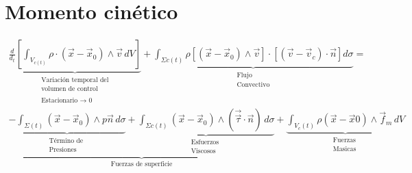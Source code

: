 \documentclass[10pt,a4paper]{article}
\begin{document}
\section{Momento cinético}
\begin{center}
    \begin{tcolorbox}[colback=yellow!40!white, colframe=red!50!black,title=Momento Cinético]
\begin{equation*}
\begin{split}
 \underbrace{\frac{d}{d_{t}}\left[\int_{V_{c(t)}} \rho \cdot\left(\vec{x}-\vec{x}_{0}\right) \wedge \vec{v} \, d V\right]}_{\substack{\text{Variación temporal del} \\ \text{volumen de control} \\ \text{} \\ \text{Estacionario $\xrightarrow{}$ 0}}} + \underbrace{\int_{\Sigma c(t)} \rho\left[\left(\vec{x}-\vec{x}_{0}\right) \wedge \vec{v}\right] \cdot\left[\left(\vec{v}-\vec{v}_{c}\right) \cdot \vec{n}\right] d \sigma}_{\substack{{\text {Flujo }} \\ {\text{Convectivo}}}} = \\
        \underbrace{\underbrace{-\int_{\Sigma(t)}\left(\vec{x}-\vec{x}_{0}\right) \wedge p \vec{n} \, d \sigma}_{\substack{\text{Término de } \\  {\text{Presiones}}}} + \underbrace{\int_{\Sigma c(t)}\left(\vec{x}-\vec{x}_{0}\right) \wedge(\vec{\vec{\tau}} \cdot \vec{n}) \, d \sigma}_{\substack{\text{Esfuerzos } \\  {\text{Viscosos}}}}}_{\text{Fuerzas de superficie}} + \underbrace{\int_{V_c(t)} \rho\left(\vec{x}-\vec{x}{0}\right) \wedge \vec{f}_{m} \, d V}_{\substack{\text{Fuerzas } \\  {\text{Masicas}}}}
\end{split}
\end{equation*}
    \end{tcolorbox}
\end{center}
\end{document}

